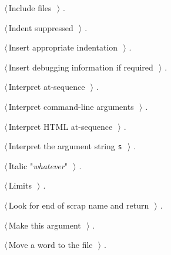 \documentclass[a4paper]{report}
\begin{document}
{\begin{list}{}{\setlength{\itemsep}{-\parsep}\setlength{\itemindent}{-\leftmargin}}
\item $\langle\,$Include files\nobreak\ {\footnotesize {}}$\,\rangle$ {\footnotesize {\NWtxtRefIn} .}
\item $\langle\,$Indent suppressed\nobreak\ {\footnotesize {}}$\,\rangle$ {\footnotesize {\NWtxtRefIn} .}
\item $\langle\,$Insert appropriate indentation\nobreak\ {\footnotesize {}}$\,\rangle$ {\footnotesize {\NWtxtRefIn} .
}
\item $\langle\,$Insert debugging information if required\nobreak\ {\footnotesize {}}$\,\rangle$ {\footnotesize {\NWtxtRefIn} .
}
\item $\langle\,$Interpret at-sequence\nobreak\ {\footnotesize {}}$\,\rangle$ {\footnotesize {\NWtxtRefIn} .}
\item $\langle\,$Interpret command-line arguments\nobreak\ {\footnotesize {}}$\,\rangle$ {\footnotesize {\NWtxtRefIn} .}
\item $\langle\,$Interpret HTML at-sequence\nobreak\ {\footnotesize {}}$\,\rangle$ {\footnotesize {\NWtxtRefIn} .}
\item $\langle\,$Interpret the argument string \verb|s|\nobreak\ {\footnotesize {}}$\,\rangle$ {\footnotesize {\NWtxtRefIn} .}
\item $\langle\,$Italic "\hbox{\slshape\sffamily whatever\/}"\nobreak\ {\footnotesize {}}$\,\rangle$ {\footnotesize {\NWtxtRefIn} .}
\item $\langle\,$Limits\nobreak\ {\footnotesize {}}$\,\rangle$ {\footnotesize {\NWtxtRefIn} .}
\item $\langle\,$Look for end of scrap name and return\nobreak\ {\footnotesize {}}$\,\rangle$ {\footnotesize {\NWtxtRefIn} .}
\item $\langle\,$Make this argument\nobreak\ {\footnotesize {}}$\,\rangle$ {\footnotesize {\NWtxtRefIn} .}
\item $\langle\,$Move a word to the file\nobreak\ {\footnotesize {}}$\,\rangle$ {\footnotesize {\NWtxtRefIn} .}

\end{list}}
\end{document}
